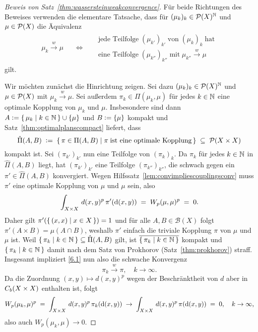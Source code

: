 \documentclass[../main/main.tex]{subfiles}
\begin{document}
	\begin{proof}[Beweis von Satz~\ref{thm:wassersteinweakconvergence}]
		Für beide Richtungen des Beweises verwenden die elementare Tatsache, dass für $(\mu_k)_k \in \mathcal{P}(X)^{\mathbb{N}}$ und $\mu \in \mathcal{P}(X)$ die Äquivalenz
		\[ \begin{matrix}
			\mu_k \xrightarrow{w} \mu \quad & \iff & \quad \begin{array}{lr}
				\text{jede Teilfolge} \; (\mu_{k'})_{k'} \; \text{von} \; (\mu_k)_k \; \text{hat} \\
				\text{eine Teilfolge} \; (\mu_{k''})_{k''} \; \text{mit} \; \mu_{k''} \xrightarrow{w} \mu
			\end{array} \label{6.1} \tag{6.1}
		\end{matrix} \]
		gilt.
		
		Wir möchten zunächst die Hinrichtung zeigen. Sei dazu $(\mu_k)_k \in \mathcal{P}(X)^{\mathbb{N}}$ und $\mu \in \mathcal{P}(X)$ mit $\mu_k \xrightarrow{w} \mu$. Sei außerdem $\pi_k \in \Pi(\mu_k, \mu)$ 
		für jedes $k \in \mathbb{N}$ eine optimale Kopplung von $\mu_k$ und $\mu$. 
		Insbesondere sind dann $A \vcentcolon = \left\{\, \mu_k \; \middle| \; k \in \mathbb{N} \,\right\} \cup \left\{\mu\right\}$ und $B \vcentcolon = \left\{\mu\right\}$ kompakt und Satz~\ref{thm:optimalplanscompact} 
		liefert, dass 
		\[ \hat{\Pi}(A, B) \; \vcentcolon = \; \left\{\, \pi \in \Pi(A, B) \; \middle| \; \pi \; \text{ist eine optimale Kopplung} \,\right\} \; \subseteq \; \mathcal{P}(X \times X) \]
		kompakt ist. 
		Sei $(\pi_{k'})_{k'}$ nun eine Teilfolge von $(\pi_k)_k$. Da $\pi_k$ für jedes $k \in \mathbb{N}$ in $\hat{\Pi}(A, B)$ liegt, hat $(\pi_{k'})_{k'}$ eine Teilfolge $(\pi_{k''})_{k''}$, 
		die schwach gegen ein $\pi' \in \hat{\Pi}(A, B)$ konvergiert. Wegen Hilfssatz~\ref{lem:convimpliescouplingsconv} muss $\pi'$ eine optimale Kopplung von $\mu$ und $\mu$ sein, also
		\[ \int_{X \times X} \, d(x, y)^p \, \pi'(\mathrm{d}(x, y)) \; = \; W_p(\mu, \mu)^p \; = \; 0 \text{.} \]
		Daher gilt $\pi'(\left\{\, (x, x) \; \middle| \; x \in X \,\right\}) = 1$ und für alle $A, B \in \mathcal{B}(X)$ folgt $\pi'(A \times B) = \mu(A \cap B)$, weshalb $\pi'$ einfach die 
		triviale Kopplung $\pi$ von $\mu$ und $\mu$ ist. Weil $\left\{\, \pi_k \; \middle| \; k \in \mathbb{N} \,\right\} \subseteq \hat{\Pi}(A, B)$ gilt, ist $\overline{\left\{\, \pi_k \; \middle| \; k \in \mathbb{N} \,\right\}}$ kompakt und $\left\{\, \pi_k \; \middle| \; k \in \mathbb{N} \,\right\}$ damit nach
		dem Satz von Prokhorov (Satz~\ref{thm:prokhorov}) straff. Insgesamt impliziert \eqref{6.1} nun also die schwache Konvergenz
		\[ \pi_k \xrightarrow{w} \pi, \quad k \to \infty \text{.} \] 
		Da die Zuordnung $(x, y) \mapsto d(x, y)^p$ wegen der Beschränktheit von $d$ aber in $C_b(X \times X)$ enthalten ist, folgt 
		\[ W_p(\mu_k, \mu)^p \; = \; \int_{X \times X} \, d(x, y)^p \, \pi_k(\mathrm{d}(x, y)) \; \to \; \int_{X \times X} \, d(x, y)^p \, \pi(\mathrm{d}(x, y)) \; = \; 0, \quad k \to \infty \text{,} \]
		also auch $W_p(\mu_k, \mu) \to 0$.
		

\end{proof}
\end{document}

